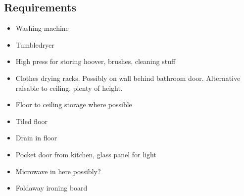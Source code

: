 \subsection{Requirements}
\begin{itemize}
\item Washing machine
\item Tumbledryer
\item High press for storing hoover, brushes, cleaning stuff
\item Clothes drying racks. Possibly on wall behind bathroom door. Alternative raisable to ceiling, plenty of height.
\item Floor to ceiling storage where possible
\item Tiled floor
\item Drain in floor
\item Pocket door from kitchen, glass panel for light
\item Microwave in here possibly?
\item Foldaway ironing board
    
\end{itemize}
